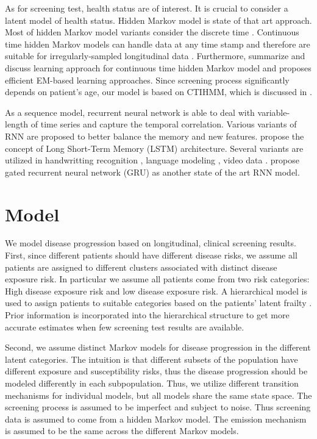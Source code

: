 \documentclass{article}
\begin{document}
As for screening test, health status are of interest. It is crucial to consider a latent model of health status. Hidden Markov model is state of that art approach. Most of hidden Markov model variants consider the discrete time \citep{Gael_2008,Beal02,Cem_2014}. Continuous time hidden Markov models can handle data at any time stamp \cite{Cox_1965} and therefore are suitable for irregularly-sampled longitudinal data \citep{Bartolonemo_2011,Liu_2013,Wang_2014}. Furthermore, \cite{Liu_2015} summarize and discuss learning approach for continuous time hidden Markov model and proposes efficient EM-based learning approaches. Since screening process significantly depends on patient's age, our model is based on CTIHMM, which is discussed in \cite{Sonnernberg_1993,Myers_2000,Canfell_2004}.

As a sequence model, recurrent neural network is able to deal with variable-length of time series and capture the temporal correlation. Various variants of RNN are proposed to better balance the memory and new features. \cite{Hochreiter_1997, Cho_2014} propose the concept of Long Short-Term Memory (LSTM) architecture. Several variants are utilized in handwritting recognition \citep{Doestsch_2014} , language modeling \citep{Stephen_2017}, video data \citep{Zhang_2016}. \cite{Chung_2014} propose gated recurrent neural network (GRU) as another state of the art RNN model.

\section{Model}
We model disease progression based on longitudinal, clinical screening results. First, since different patients should have different disease risks, we assume all patients are assigned to different clusters associated with distinct disease exposure risk. In particular we assume all patients come from two risk categories: High disease exposure risk and low disease exposure risk. A hierarchical model is used to  assign patients to suitable categories based on the patients' latent frailty \cite{Amy2010}.  Prior information is incorporated into the hierarchical structure to get more accurate estimates  when few screening test results are available.

Second, we assume distinct Markov models for disease progression in the different latent categories. The intuition is that different subsets of the population have different exposure and susceptibility risks, thus the disease progression should be modeled differently in each subpopulation.
Thus, we utilize different transition mechanisms for individual models, but all models share the same state space. The screening process is assumed to be imperfect and subject to noise. Thus screening data is assumed to come from a hidden Markov model.  The emission mechanism is assumed to be the same across the different Markov models. 
\end{document}
